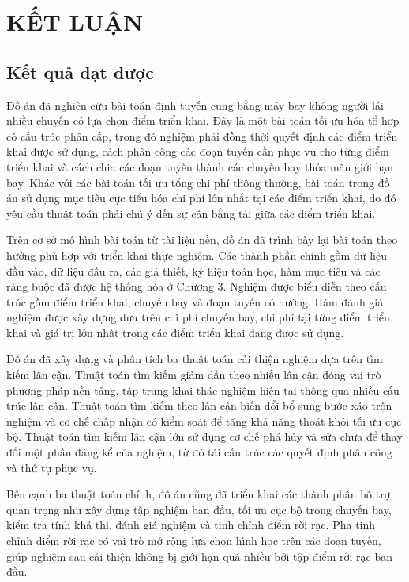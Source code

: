 \chapter{KẾT LUẬN}
\label{chap:ket-luan}

\section{Kết quả đạt được}

Đồ án đã nghiên cứu bài toán định tuyến cung bằng máy bay không người lái nhiều chuyến có lựa chọn điểm triển khai. Đây là một bài toán tối ưu hóa tổ hợp có cấu trúc phân cấp, trong đó nghiệm phải đồng thời quyết định các điểm triển khai được sử dụng, cách phân công các đoạn tuyến cần phục vụ cho từng điểm triển khai và cách chia các đoạn tuyến thành các chuyến bay thỏa mãn giới hạn bay. Khác với các bài toán tối ưu tổng chi phí thông thường, bài toán trong đồ án sử dụng mục tiêu cực tiểu hóa chi phí lớn nhất tại các điểm triển khai, do đó yêu cầu thuật toán phải chú ý đến sự cân bằng tải giữa các điểm triển khai.

Trên cơ sở mô hình bài toán từ tài liệu nền, đồ án đã trình bày lại bài toán theo hướng phù hợp với triển khai thực nghiệm. Các thành phần chính gồm dữ liệu đầu vào, dữ liệu đầu ra, các giả thiết, ký hiệu toán học, hàm mục tiêu và các ràng buộc đã được hệ thống hóa ở Chương 3. Nghiệm được biểu diễn theo cấu trúc gồm điểm triển khai, chuyến bay và đoạn tuyến có hướng. Hàm đánh giá nghiệm được xây dựng dựa trên chi phí chuyến bay, chi phí tại từng điểm triển khai và giá trị lớn nhất trong các điểm triển khai đang được sử dụng.

Đồ án đã xây dựng và phân tích ba thuật toán cải thiện nghiệm dựa trên tìm kiếm lân cận. Thuật toán tìm kiếm giảm dần theo nhiều lân cận đóng vai trò phương pháp nền tảng, tập trung khai thác nghiệm hiện tại thông qua nhiều cấu trúc lân cận. Thuật toán tìm kiếm theo lân cận biến đổi bổ sung bước xáo trộn nghiệm và cơ chế chấp nhận có kiểm soát để tăng khả năng thoát khỏi tối ưu cục bộ. Thuật toán tìm kiếm lân cận lớn sử dụng cơ chế phá hủy và sửa chữa để thay đổi một phần đáng kể của nghiệm, từ đó tái cấu trúc các quyết định phân công và thứ tự phục vụ.

Bên cạnh ba thuật toán chính, đồ án cũng đã triển khai các thành phần hỗ trợ quan trọng như xây dựng tập nghiệm ban đầu, tối ưu cục bộ trong chuyến bay, kiểm tra tính khả thi, đánh giá nghiệm và tinh chỉnh điểm rời rạc. Pha tinh chỉnh điểm rời rạc có vai trò mở rộng lựa chọn hình học trên các đoạn tuyến, giúp nghiệm sau cải thiện không bị giới hạn quá nhiều bởi tập điểm rời rạc ban đầu.


